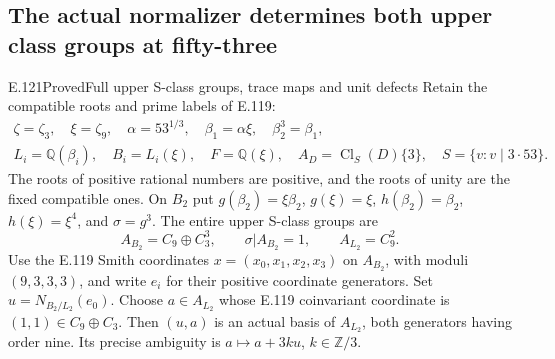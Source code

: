 \subsection{The actual normalizer determines both upper class groups at fifty-three}

\begin{statement}{E.121}{Proved}{Full upper S-class groups, trace maps and unit defects}
Retain the compatible roots and prime labels of E.119:
\[
 \begin{gathered}
 \zeta=\zeta_3,\quad \xi=\zeta_9,\quad
 \alpha=53^{1/3},\quad
 \beta_1=\alpha\xi,\quad \beta_2^3=\beta_1,\\
 L_i=\mathbb Q(\beta_i),\quad B_i=L_i(\xi),\quad
 F=\mathbb Q(\xi),\quad
 A_D=\operatorname{Cl}_S(D)\{3\},\quad S=\{v:v\mid3\cdot53\}.
 \end{gathered}
 \tag{E121.1}
\]
The roots of positive rational numbers are positive, and the
roots of unity are the fixed compatible ones. On $B_2$ put
$g(\beta_2)=\xi\beta_2$, $g(\xi)=\xi$,
$h(\beta_2)=\beta_2$, $h(\xi)=\xi^4$, and $\sigma=g^3$.
The entire upper S-class groups are
\[
 A_{B_2}=C_9\oplus C_3^3,\qquad
 \sigma|A_{B_2}=1,\qquad
 A_{L_2}=C_9^2.
 \tag{E121.2}
\]
Use the E.119 Smith coordinates $x=(x_0,x_1,x_2,x_3)$ on
$A_{B_2}$, with moduli $(9,3,3,3)$, and write $e_i$ for their
positive coordinate generators. Set $u=N_{B_2/L_2}(e_0)$.
Choose $a\in A_{L_2}$ whose E.119 coinvariant coordinate is
$(1,1)\in C_9\oplus C_3$. Then $(u,a)$ is an actual basis of
$A_{L_2}$, both generators having order nine. Its precise
ambiguity is $a\mapsto a+3ku$, $k\in\mathbb Z/3$.


\end{statement}

